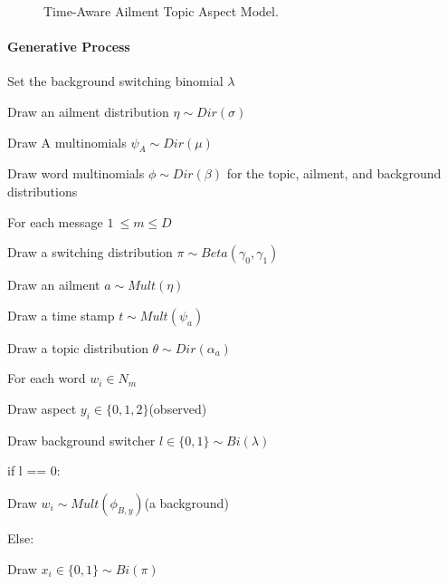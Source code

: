 \begin{figure}[ht]
  \begin{center}
    
  \end{center}
  \caption{Time-Aware Ailment Topic Aspect Model.}
\label{T_atam}
\end{figure}

\paragraph{Generative Process}
\begin{myEnumerate}
 \item Set the background switching binomial $\lambda$
 \item Draw an ailment distribution $\eta \sim Dir(\sigma)$ 
 \item Draw A multinomials $\psi_A \sim Dir(\mu)$
 \item Draw word multinomials $\phi \sim Dir(\beta)$ for the topic, ailment, and background distributions
 \item For each message $1\ \leq m\leq D$
 \begin{myEnumerate}
  \item Draw a switching distribution $\pi \sim Beta(\gamma_0,\gamma_1)$
  \item Draw an ailment $a\sim Mult(\eta)$
  \item Draw a time stamp $t \sim Mult(\psi_a)$
  \item Draw a topic distribution $\theta \sim Dir(\alpha_a)$
  \item For each word $w_i\in N_m$
  \begin{myEnumerate}
   \item Draw aspect $y_i\in\{0,1,2\}$(observed)
   \item Draw background switcher $l\in\{0,1\}\sim Bi(\lambda)$
   \item if l == 0:
   \begin{myEnumerate}
    \item Draw $w_i\sim Mult(\phi_{B,y})$(a background)
   \end{myEnumerate}
   \item Else:
   \begin{myEnumerate}
    \item Draw $x_i\in \{0,1\} \sim Bi(\pi)$

\end{myEnumerate}
\end{myEnumerate}
\end{myEnumerate}
\end{myEnumerate}
